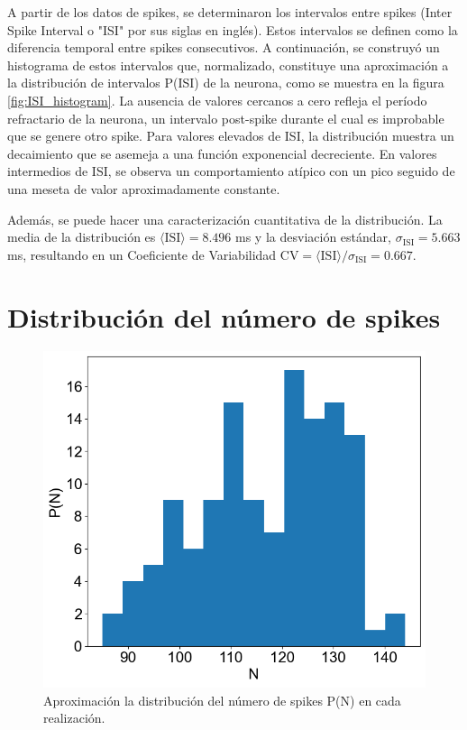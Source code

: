 \documentclass[aps,prb,twocolumn,superscriptaddress,floatfix,longbibliography]{revtex4-2}
\begin{document}
A partir de los datos de spikes, se determinaron los intervalos entre spikes (Inter Spike Interval o "ISI" por sus siglas en inglés). Estos intervalos se definen como la diferencia temporal entre spikes consecutivos. A continuación, se construyó un histograma de estos intervalos que, normalizado, constituye una aproximación a la distribución de intervalos P(ISI) de la neurona, como se muestra en la figura \ref{fig:ISI_histogram}. La ausencia de valores cercanos a cero refleja el período refractario de la neurona, un intervalo post-spike durante el cual es improbable que se genere otro spike. Para valores elevados de ISI, la distribución muestra un decaimiento que se asemeja a una función exponencial decreciente. En valores intermedios de ISI, se observa un comportamiento atípico con un pico seguido de una meseta de valor aproximadamente constante.

Además, se puede hacer una caracterización cuantitativa de la distribución. La media de la distribución es $\langle \mathrm{ISI} \rangle = 8.496$ ms y la desviación estándar, $\sigma_{\mathrm{ISI}} = 5.663$ ms, resultando en un Coeficiente de Variabilidad $\mathrm{CV} = \langle \mathrm{ISI} \rangle / \sigma_{\mathrm{ISI}} =  0.667$.

\section{Distribución del número de spikes}

\begin{figure}[h]
  \includegraphics[clip=true,width=0.8\columnwidth]{N_histogram.png}
  \caption{Aproximación la distribución del número de spikes P(N) en cada realización.}
   \label{fig:N_histogram}
\end{figure}
\end{document}
